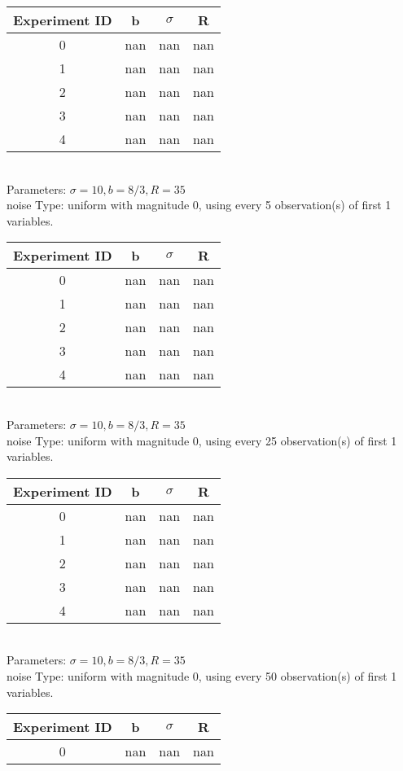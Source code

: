 \begin{multicols}{3}
\begin{tabular}{cccc}
\hline Experiment ID & b & $\sigma$ & R \\ \hline 
0 & nan & nan & nan\\ \hline 
 1 & nan & nan & nan\\ \hline 
 2 & nan & nan & nan\\ \hline 
 3 & nan & nan & nan\\ \hline 
 4 & nan & nan & nan\\ \hline 
 \end{tabular}\\
Parameters: $\sigma=10, b=8/3, R=35$\\
noise Type: uniform with magnitude 0, using every 5 observation(s) of first 1 variables.\\
\begin{tabular}{cccc}
\hline Experiment ID & b & $\sigma$ & R \\ \hline 
0 & nan & nan & nan\\ \hline 
 1 & nan & nan & nan\\ \hline 
 2 & nan & nan & nan\\ \hline 
 3 & nan & nan & nan\\ \hline 
 4 & nan & nan & nan\\ \hline 
 \end{tabular}\\
Parameters: $\sigma=10, b=8/3, R=35$\\
noise Type: uniform with magnitude 0, using every 25 observation(s) of first 1 variables.\\
\begin{tabular}{cccc}
\hline Experiment ID & b & $\sigma$ & R \\ \hline 
0 & nan & nan & nan\\ \hline 
 1 & nan & nan & nan\\ \hline 
 2 & nan & nan & nan\\ \hline 
 3 & nan & nan & nan\\ \hline 
 4 & nan & nan & nan\\ \hline 
 \end{tabular}\\
Parameters: $\sigma=10, b=8/3, R=35$\\
noise Type: uniform with magnitude 0, using every 50 observation(s) of first 1 variables.\\
\begin{tabular}{cccc}
\hline Experiment ID & b & $\sigma$ & R \\ \hline 
0 & nan & nan & nan\\ \hline 

\end{tabular}
\end{multicols}
